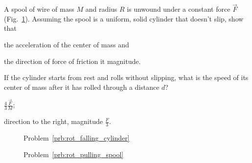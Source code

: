 \begin{problem}\label{prb:rot_pulling_spool}
	A spool of wire of mass $M$ and radius $R$ is unwound under a constant force $\vec F$ (Fig.~\ref{rot_pulling_spool}). Assuming the spool is a uniform, solid cylinder that doesn’t slip, show that 
	\begin{enumerate*}[label=(\alph*)]
		\item the acceleration of the center of mass and
		\item the direction of force of friction it magnitude.
		\item If the cylinder starts from rest and rolls without slipping, what is the speed of its center of mass after it has rolled through a distance $d$?
	\end{enumerate*}
	\begin{solution}
		\begin{enumerate*}[label=(\alph*)]
			\item $\frac43 \frac{\vec F}{M}$;
			\item direction to the right, magnitude $\frac{F}{3}$.
		\end{enumerate*}
	\end{solution}
\end{problem}

\begin{figure}[h!]\centering
	\begin{minipage}[t]{0.45\linewidth}\centering
		\caption{Problem~\ref{prb:rot_falling_cylinder}}
		\label{rot_falling_cylinder}
	\end{minipage}
	\begin{minipage}[t]{0.45\linewidth}\centering
		\caption{Problem~\ref{prb:rot_pulling_spool}}
		\label{rot_pulling_spool}
	\end{minipage}
\end{figure}

